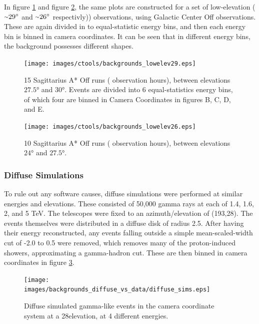 In figure \ref{fig:back_lowelev29} and figure \ref{fig:back_lowelev26}, the same plots are constructed for a set of low-elevation ($ \nicetilde \ang{29} $ and $ \nicetilde \ang{26} $ respectivly)) observations, using Galactic Center Off observations.
These are again divided in to equal-statistic energy bins, and then each energy bin is binned in camera coordinates.
It can be seen that in different energy bins, the background possesses different shapes.

\begin{figure}[ht]
  \begin{center}
    \texttt{[image: images/ctools/backgrounds\_lowelev29.eps]}
    \caption[CTOOLS Background at 29\degree Elevation]{15 Sagittarius A* Off runs ( observation hours), between elevations $ \ang{27.5} $ and $ \ang{30} $.  Events are divided into 6 equal-statistics energy bins, of which four are binned in Camera Coordinates in figures B, C, D, and E.}\label{fig:back_lowelev29}
  \end{center}
\end{figure}

\begin{figure}[ht]
  \begin{center}
    \texttt{[image: images/ctools/backgrounds\_lowelev26.eps]}
    \caption[CTOOLS Background at 26\degree Elevation]{10 Sagittarius A* Off runs ( observation hours), between elevations $ \ang{24} $ and $ \ang{27.5} $. }\label{fig:back_lowelev26}
  \end{center}
\end{figure}


\subsubsection{Diffuse Simulations}

To rule out any software causes, diffuse simulations were performed at similar energies and elevations.
These consisted of 50,000 gamma rays at each of 1.4, 1.6, 2, and 5 TeV.
The telescopes were fixed to an azimuth/elevation of (193\degree,28\degree).
The events themselves were distributed in a diffuse disk of radius 2.5\degree.
After having their energy reconstructed, any events falling outside a simple mean-scaled-width cut of -2.0 to 0.5 were removed, which removes many of the proton-induced showers, approximating a gamma-hadron cut.
These are then binned in camera coordinates in figure \ref{fig:back_simdiffuse}.

\begin{figure}[ht]
  \begin{center}
    \texttt{[image: images/backgrounds\_diffuse\_vs\_data/diffuse\_sims.eps]}
    \caption[Diffuse Simulated Backgrounds]{Diffuse simulated gamma-like events in the camera coordinate system at a 28\degree elevation, at 4 different energies.}\label{fig:back_simdiffuse}
  \end{center}
\end{figure}

